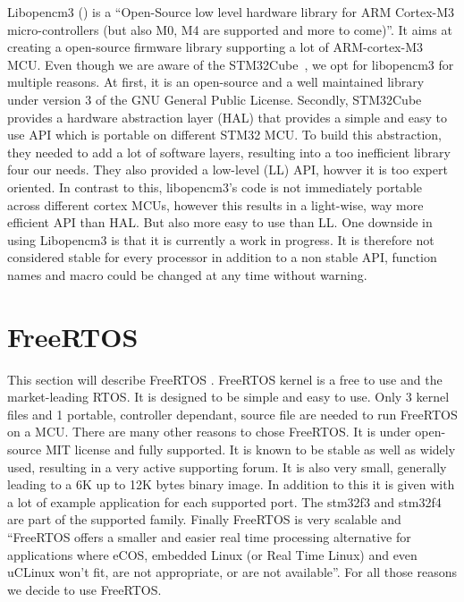 \documentclass[12pt,a4paper]{report}
\begin{document}
\label{sec:libopencm3}
Libopencm3 (\cite{cm3}) is a ``Open-Source low level hardware library for ARM Cortex-M3 micro-controllers (but also M0, M4 are supported and more to come)''. It aims at creating a open-source firmware library supporting a lot of ARM-cortex-M3 MCU. Even though we are aware of the STM32Cube~\cite{cube}, we opt for libopencm3 for multiple reasons. At first, it is an open-source and a well maintained library under version 3 of the GNU General Public License. Secondly, STM32Cube provides a hardware abstraction layer (HAL) that provides a simple and easy to use API which  is portable on different STM32 MCU. To build this abstraction, they needed to add a lot of software layers, resulting into a too inefficient library four our needs. They also provided a low-level (LL) API, howver it is too expert oriented. In contrast to this, libopencm3's code is not immediately portable across different cortex MCUs, however this results in a light-wise, way more efficient API than HAL. But also more easy to use than LL.\newline
One downside in using Libopencm3 is that it is currently a work in progress. It is therefore not considered stable for every processor in addition to a non stable API, function names and macro could be changed at any time without warning.\newpage
\section{FreeRTOS}

\label{sec:freeRTOS}
This section will describe FreeRTOS \cite{FreeRTOSBook}. FreeRTOS kernel is a free to use and the market-leading RTOS. It is designed to be simple and easy to use. Only 3 kernel files and 1 portable, controller dependant, source file are needed to run FreeRTOS on a MCU. There are many other reasons to chose FreeRTOS. It is under open-source MIT license and fully supported. It is known to be stable as well as widely used, resulting in a very active supporting forum. It is also very small, generally leading to a 6K up to 12K bytes binary image. In addition to this it is given with a lot of example application for each supported port. The stm32f3 and stm32f4 are part of the supported family. Finally FreeRTOS is very scalable and ``FreeRTOS offers a smaller and easier real time processing alternative for applications where eCOS, embedded Linux (or Real Time Linux) and even uCLinux won't fit, are not appropriate, or are not available''.\newline
For all those reasons we decide to use FreeRTOS.
\end{document}
